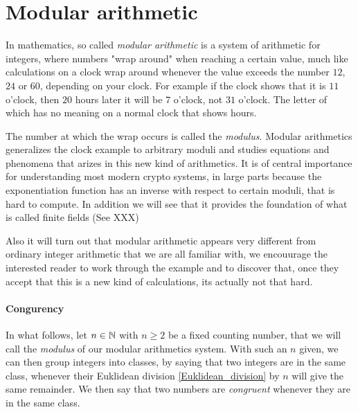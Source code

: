 \section{Modular arithmetic}
In mathematics, so called \textit{modular arithmetic} is a system of arithmetic for integers, where numbers "wrap around" when reaching a certain value, much like calculations on a clock wrap around whenever the value exceeds the number $12$, $24$ or $60$, depending on your clock. For example if the clock shows that it is $11$ o'clock, then $20$ hours later it will be $7$ o'clock, not $31$ o'clock. The letter of which has no meaning on a normal clock that shows hours. 

The number at which the wrap occurs is called the \textit{modulus}. Modular arithmetics generalizes the clock example to arbitrary moduli and studies equations and phenomena that arizes in this new kind of arithmetics. It is of central importance for understanding most modern crypto systems, in large parts because the exponentiation function has an inverse with respect to certain moduli, that is hard to compute. In addition we will see that it provides the foundation of what is called finite fields (See XXX)

Also it will turn out that modular arithmetic appears very different from ordinary integer arithmetic that we are all familiar with, we encouurage the interested reader to work through the example and to discover that, once they accept that this is a new kind of calculations, its actually not that hard.
\paragraph{Congurency}
In what follows, let $n\in\mathbb{N}$ with $n\geq 2$ be a fixed counting number, that we will call the \textit{modulus} of our modular arithmetics system. With such an $n$ given, we can then group integers into classes, by saying that two integers are in the same class, whenever their Euklidean division \ref{Euklidean_division} by $n$ will give the same remainder. We then say that two numbers are \textit{congruent} whenever they are in the same class.

